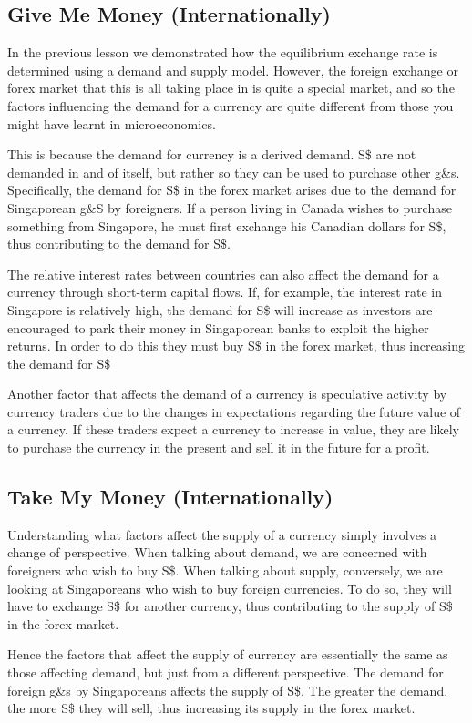 \documentclass[DIV=classic,11pt,numbers=noenddot,parskip]{scrartcl}
\begin{document}
\subsection{Give Me Money (Internationally)}
In the previous lesson we demonstrated how the equilibrium exchange rate is determined using a demand and supply model. However, the foreign exchange or forex market that this is all taking place in is quite a special market, and so the factors influencing the demand for a currency are quite different from those you might have learnt in microeconomics.

This is because the demand for currency is a derived demand. S\$ are not demanded in and of itself, but rather so they can be used to purchase other g\&s. Specifically, the demand for S\$ in the forex market arises due to the demand for Singaporean g\&S by foreigners. If a person living in Canada wishes to purchase something from Singapore, he must first exchange his Canadian dollars for S\$, thus contributing to the demand for S\$.

The relative interest rates between countries can also affect the demand for a currency through short-term capital flows. If, for example, the interest rate in Singapore is relatively high, the demand for S\$ will increase as investors are encouraged to park their money in Singaporean banks to exploit the higher returns. In order to do this they must buy S\$ in the forex market, thus increasing the demand for S\$

Another factor that affects the demand of a currency is speculative activity by currency traders due to the changes in expectations regarding the future value of a currency. If these traders expect a currency to increase in value, they are likely to purchase the currency in the present and sell it in the future for a profit.
\subsection{Take My Money (Internationally)}
Understanding what factors affect the supply of a currency simply involves a change of perspective. When talking about demand, we are concerned with foreigners who wish to buy S\$. When talking about supply, conversely, we are looking at Singaporeans who wish to buy foreign currencies. To do so, they will have to exchange S\$ for another currency, thus contributing to the supply of S\$ in the forex market.

Hence the factors that affect the supply of currency are essentially the same as those affecting demand, but just from a different perspective. The demand for foreign g\&s by Singaporeans affects the supply of S\$. The greater the demand, the more S\$ they will sell, thus increasing its supply in the forex market.
\end{document}

